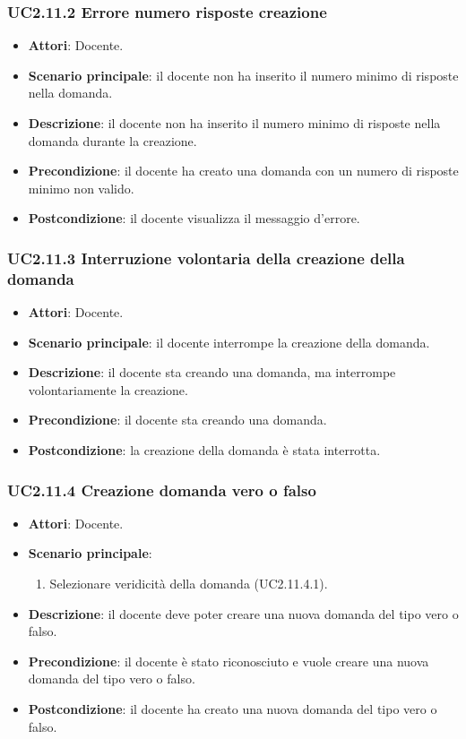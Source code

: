 \subsubsection{UC2.11.2 Errore numero risposte creazione}
\begin{itemize}
\item \textbf{Attori}: Docente.
\item \textbf{Scenario principale}: il docente non ha inserito il numero minimo di risposte nella domanda.
\item \textbf{Descrizione}: il docente non ha inserito il numero minimo di risposte nella domanda durante la creazione.
\item \textbf{Precondizione}: il docente ha creato una domanda con un numero di risposte minimo non valido.
\item \textbf{Postcondizione}: il docente visualizza il messaggio d'errore.
\end{itemize}
\subsubsection{UC2.11.3 Interruzione volontaria della creazione della domanda}
\begin{itemize}
\item \textbf{Attori}: Docente.
\item \textbf{Scenario principale}: il docente interrompe la creazione della domanda.
\item \textbf{Descrizione}: il docente sta creando una domanda, ma interrompe volontariamente la creazione.
\item \textbf{Precondizione}: il docente sta creando una domanda.
\item \textbf{Postcondizione}: la creazione della domanda è stata interrotta.
\end{itemize}
\subsubsection{UC2.11.4 Creazione domanda vero o falso}
\begin{itemize}
\item \textbf{Attori}: Docente.
\item \textbf{Scenario principale}:
\begin{enumerate}
\item Selezionare veridicità della domanda (UC2.11.4.1).
\end{enumerate}
\item \textbf{Descrizione}: il docente deve poter creare una nuova domanda del tipo vero o falso.
\item \textbf{Precondizione}: il docente è stato riconosciuto e vuole creare una nuova domanda del tipo vero o falso.
\item \textbf{Postcondizione}: il docente ha creato una nuova domanda del tipo vero o falso.
\end{itemize}
